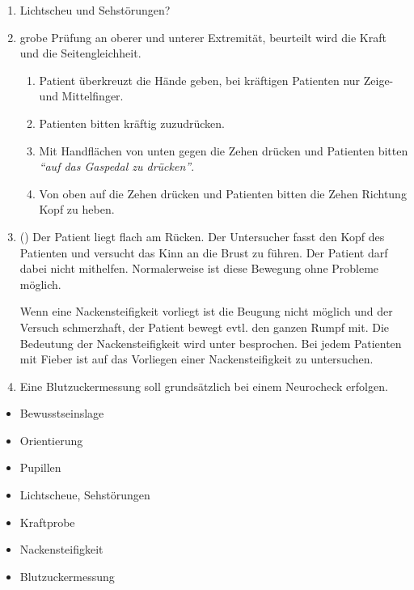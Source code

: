 {\begin{enumerate}
\begin{enumerate}
  Beurteilung von:
  \begin{enumerate}
      \item Orientierung zu Person, Ort, Zeit und Situation.
  \item Schnelligkeit der Reaktion: prompt, verzögert?
  \item Reagieren immer beide
  Pupillen?~
    \end{enumerate}
\end{enumerate}
  \item Lichtscheu und Sehstörungen?
  \item {} grobe Prüfung an oberer und
  unterer Extremität, beurteilt wird die Kraft und die
  Seitengleichheit. 
    \begin{enumerate}
  \item Patient überkreuzt die Hände geben, bei kräftigen
  Patienten nur Zeige- und Mittelfinger.
  \item Patienten bitten kräftig zuzudrücken.
  \item Mit Handflächen von unten gegen die Zehen drücken
  und Patienten bitten \emph{"`auf das Gaspedal zu
  drücken"'}.
  \item Von oben auf die Zehen drücken und Patienten bitten
  die Zehen Richtung Kopf zu heben.
\end{enumerate}
  \item {} () Der
  Patient liegt flach am Rücken. Der Untersucher fasst den
  Kopf des Patienten und versucht das Kinn an die Brust zu
  führen. Der Patient darf dabei nicht mithelfen.
  Normalerweise ist diese Bewegung ohne Probleme möglich.
  
  Wenn eine Nackensteifigkeit vorliegt ist die Beugung nicht
  möglich und der Versuch schmerzhaft, der Patient bewegt
  evtl. den ganzen Rumpf mit. Die Bedeutung der
  Nackensteifigkeit wird unter 
  besprochen. Bei jedem Patienten mit Fieber ist auf das
  Vorliegen einer Nackensteifigkeit zu untersuchen.  
  \item {} Eine Blutzuckermessung soll
  grundsätzlich bei einem Neurocheck erfolgen.
\end{enumerate}
}{
\begin{itemize}
  \item Bewusstseinslage
  \item Orientierung
  \item Pupillen
  \item Lichtscheue, Sehstörungen
  \item Kraftprobe
  \item Nackensteifigkeit
  \item Blutzuckermessung
\end{itemize}
}{}{}{}

